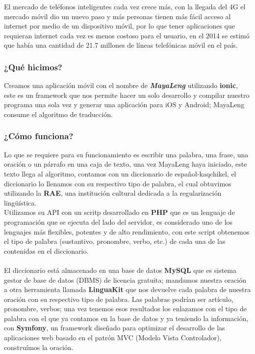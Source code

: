 \documentclass[a4paper,openright,11pt]{article}
\begin{document}
El mercado de teléfonos inteligentes cada vez crece más, con la llegada del 4G el mercado móvil dio un nuevo paso y más personas tienen más fácil acceso al internet por medio de un dispositivo móvil, por lo que tener aplicaciones que requieran internet cada vez es menos costoso para el usuario, en el 2014 se estimó que había una cantidad de 21.7 millones de líneas telefónicas móvil en el país.

\subsubsection{¿Qué hicimos?}
Creamos una aplicación móvil con el nombre de \textbf{\textit{MayaLeng}} utilizando \textbf{ionic}, este es un framework que nos permite hacer un solo desarrollo y compilar nuestro programa una sola vez y generar una aplicación para iOS y Android; MayaLeng consume el algoritmo de traducción.

\subsubsection{¿Cómo funciona?}
Lo que se requiere para su funcionamiento es escribir una palabra, una frase, una oración o un párrafo en una caja de texto, una vez MayaLeng haya iniciado, este texto llega al algoritmo, contamos con un diccionario de español-kaqchikel, el diccionario lo llenamos con su respectivo tipo de palabra, el cual obtuvimos utilizando la \textbf{RAE}, una institución cultural dedicada a la regularización lingüística.\\
Utilizamos su API con un scritp desarrollado en \textbf{PHP} que es un lenguaje de programación que se ejecuta del lado del servidor, es considerado uno de los lenguajes más flexibles, potentes y de alto rendimiento,  con este script obtenemos el tipo de palabra (sustantivo, pronombre, verbo, etc.) de cada una de las contenidas en el diccionario.\\\\

El diccionario está almacenado en una base de datos \textbf{MySQL} que es sistema gestor de base de datos (DBMS) de licencia gratuita; mandamos nuestra oración a otra herramienta llamada \textbf{LinguaKit} que nos devuelve cada palabra de nuestra oración con su respectivo tipo de palabra. Las palabras podrían ser artículo, pronombre, verbos; una vez tenemos esos resultados los enlazamos con el tipo de palabra con el que ya contamos en la base de datos y ya teniendo la información, con \textbf{Symfony}, un framework diseñado para optimizar el desarrollo de las aplicaciones web basado en el patrón MVC (Modelo Vista Controlador), construímos la oración.\\\\
\end{document}
